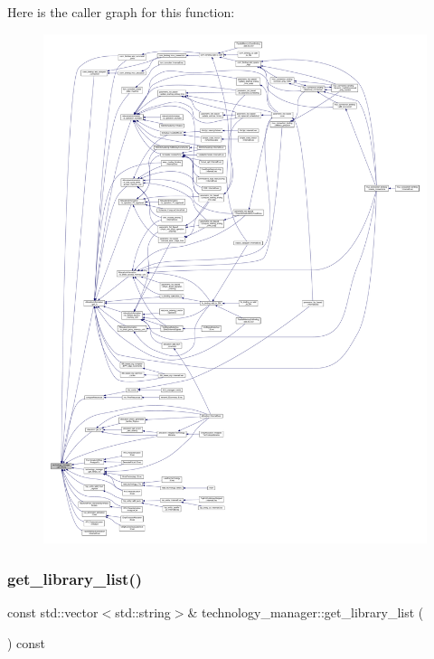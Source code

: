 Here is the caller graph for this function\+:
\nopagebreak
\begin{figure}[H]
\begin{center}
\leavevmode
\includegraphics[width=350pt]{df/dc7/classtechnology__manager_a6197597d8ed453fe9f989f94a59429ef_icgraph}
\end{center}
\end{figure}
\mbox{\label{classtechnology__manager_a627c7ca63f6fd50d575f5ebffcec34a2}} 
\subsubsection{\texorpdfstring{get\+\_\+library\+\_\+list()}{get\_library\_list()}}
{\footnotesize\ttfamily const std\+::vector$<$std\+::string$>$\& technology\+\_\+manager\+::get\+\_\+library\+\_\+list (\begin{DoxyParamCaption}{ }\end{DoxyParamCaption}) const\hspace{0.3cm}{\ttfamily [inline]}}



